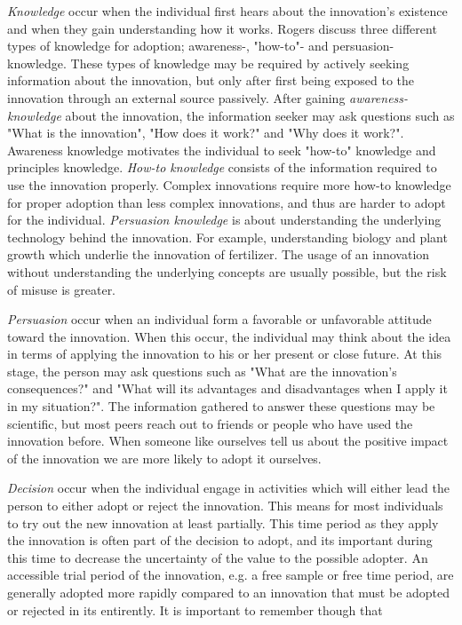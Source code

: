 \textit{Knowledge} occur when the individual first hears about the innovation's existence and when they gain understanding how it works. Rogers discuss three different types of knowledge for adoption; awareness-, "how-to"- and persuasion- knowledge. These types of knowledge may be required by actively seeking information about the innovation, but only after first being exposed to the innovation through an external source passively. After gaining \textit{awareness-knowledge} about the innovation, the information seeker may ask questions such as "What is the innovation", "How does it work?" and "Why does it work?". Awareness knowledge motivates the individual to seek "how-to" knowledge and principles knowledge. \textit{How-to knowledge} consists of the information required to use the innovation properly. Complex innovations require more how-to knowledge for proper adoption than less complex innovations, and thus are harder to adopt for the individual. \textit{Persuasion knowledge} is about understanding the underlying technology behind the innovation. For example, understanding biology and plant growth which underlie the innovation of fertilizer. The usage of an innovation without understanding the underlying concepts are usually possible, but the risk of misuse is greater.

\textit{Persuasion} occur when an individual form a favorable or unfavorable attitude toward the innovation. When this occur, the individual may think about the idea in terms of applying the innovation to his or her present or close future. At this stage, the person may ask questions such as "What are the innovation's consequences?" and "What will its advantages and disadvantages when I apply it in my situation?". The information gathered to answer these questions may be scientific, but most peers reach out to friends or people who have used the innovation before. When someone like ourselves tell us about the positive impact of the innovation we are more likely to adopt it ourselves.

\textit{Decision} occur when the individual engage in activities which will either lead the person to either adopt or reject the innovation. This means for most individuals to try out the new innovation at least partially. This time period as they apply the innovation is often part of the decision to adopt, and its important during this time to decrease the uncertainty of the value to the possible adopter. An accessible trial period of the innovation, e.g. a free sample or free time period, are generally adopted more rapidly compared to an innovation that must be adopted or rejected in its entirently. It is important to remember though that

